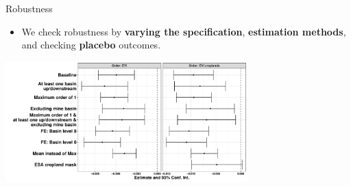 \documentclass[aspectratio=169,11pt,dvipsnames, handout]{beamer}
\begin{document}

\begin{frame}{Robustness}
\label{frame:robust}

\begin{itemize}
    \item We check robustness by \textbf{varying the specification}, \textbf{estimation methods}, and checking \textbf{placebo} outcomes.
\end{itemize}
\pause
\vspace{0.5em}

    \centering
    \includegraphics[width=0.7\textwidth]{img/plot_robustness_presentation.pdf}


\hyperlink{frame:sampledef}{} \hyperlink{frame:outfedef}{} 
 \hyperlink{frame:placebo}{} 
  \hyperlink{frame:autband}{} 
\end{frame}


\end{document}
